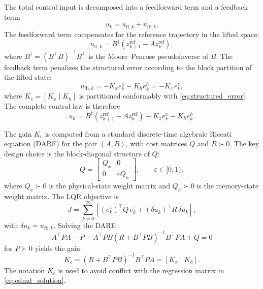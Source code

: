 \documentclass[journal]{IEEEtran}
\begin{document}
The total control input is decomposed into a feedforward term and a feedback term:
\begin{equation}
    u_k = u_{\mathrm{ff},k} + u_{\mathrm{fb},k}.
    \label{eq:ctrl_decomp}
\end{equation}
The feedforward term compensates for the reference trajectory in the lifted space:
\begin{equation}
    u_{\mathrm{ff},k} = B^\dagger\!\left(z_{k+1}^{\mathrm{ref}} - A z_k^{\mathrm{ref}}\right),
    \label{eq:feedforward}
\end{equation}
where $B^\dagger = (B^\top B)^{-1}B^\top$ is the Moore--Penrose pseudoinverse of $B$. The feedback term penalizes the structured error according to the block partition of the lifted state:
\begin{equation}
    u_{\mathrm{fb},k} = -K_x e_k^x - K_h e_k^h = -K_c\, e_k^z,
    \label{eq:hierarchical_fb}
\end{equation}
where $K_c = [K_x\;|\;K_h]$ is partitioned conformably with \eqref{eq:structured_error}. The complete control law is therefore
\begin{equation}
    u_k = B^\dagger\!\left(z_{k+1}^{\mathrm{ref}} - A z_k^{\mathrm{ref}}\right) - K_x e_k^x - K_h e_k^h.
    \label{eq:full_ctrl}
\end{equation}

The gain $K_c$ is computed from a standard discrete-time algebraic Riccati equation (DARE) for the pair $(A,B)$, with cost matrices $Q$ and $R \succ 0$. The key design choice is the block-diagonal structure of $Q$:
\begin{equation}
    Q = \begin{bmatrix} Q_x & 0 \\ 0 & \varepsilon Q_h \end{bmatrix},
    \qquad \varepsilon \in [0,1),
    \label{eq:block_diag_Q}
\end{equation}
where $Q_x \succ 0$ is the physical-state weight matrix and $Q_h \succ 0$ is the memory-state weight matrix. The LQR objective is
\begin{equation}
    J = \sum_{k=0}^{\infty}
    \left[(e_k^z)^\top Q\, e_k^z + (\delta u_k)^\top R\,\delta u_k\right],
    \label{eq:lqr_objective}
\end{equation}
with $\delta u_k = u_{\mathrm{fb},k}$. Solving the DARE
\begin{equation}
    A^\top P A - P - A^\top P B(R + B^\top P B)^{-1}B^\top P A + Q = 0
    \label{eq:dare}
\end{equation}
for $P \succ 0$ yields the gain
\begin{equation}
    K_c = (R + B^\top P B)^{-1}B^\top P A = [K_x\;|\;K_h].
    \label{eq:lqr_gain}
\end{equation}
The notation $K_c$ is used to avoid conflict with the regression matrix in \eqref{eq:edmd_solution}.
\end{document}
